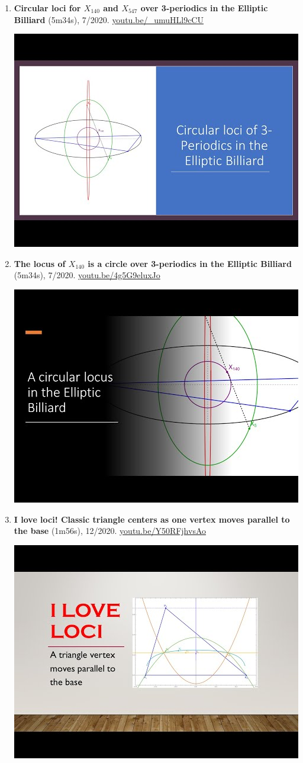 \documentclass[12pt]{article}
\begin{document}
\begin{enumerate}[resume]
% 
\item \textbf{Circular loci for $X_{140}$ and $X_{547}$ over 3-periodics in the Elliptic Billiard} (5m34s), 7/2020. \href{https://youtu.be/_umuHLl9cCU}{\url{youtu.be/\_umuHLl9cCU}}
\begin{center}\includegraphics[width=.5\textwidth]{pics/_umuHLl9cCU.jpg}\end{center}
% 
\item \textbf{The locus of $X_{140}$ is a circle over 3-periodics in the Elliptic Billiard} (5m34s), 7/2020. \href{https://youtu.be/4g5G9eluxJo}{\url{youtu.be/4g5G9eluxJo}}
\begin{center}\includegraphics[width=.5\textwidth]{pics/4g5G9eluxJo.jpg}\end{center}
% 
\item \textbf{I love loci! Classic triangle centers as one vertex moves parallel to the base} (1m56s), 12/2020. \href{https://youtu.be/Y50RFjhvsAo}{\url{youtu.be/Y50RFjhvsAo}}
\begin{center}\includegraphics[width=.5\textwidth]{pics/Y50RFjhvsAo.jpg}\end{center}

\end{enumerate}
\end{document}
